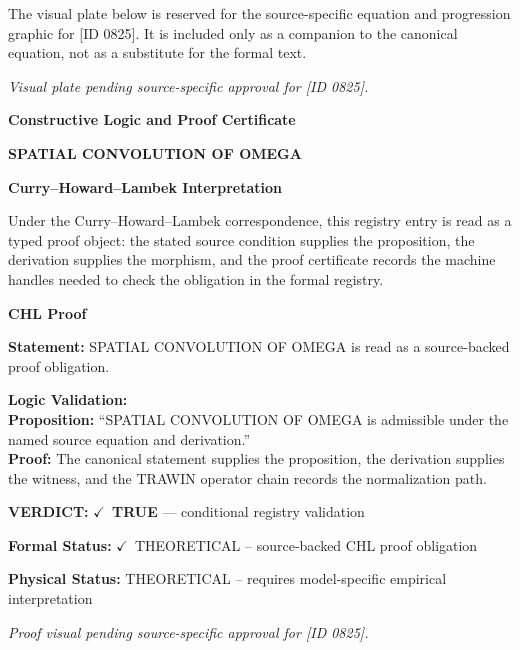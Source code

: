 \begingroup\footnotesize\sloppy
The visual plate below is reserved for the source-specific equation and progression graphic for [ID 0825]. It is included only as a companion to the canonical equation, not as a substitute for the formal text.
\par\endgroup
\begingroup\footnotesize\itshape
Visual plate pending source-specific approval for [ID 0825].
\par\endgroup

\clearpage
\begingroup\tzpsupportsetup
\noindent\textbf{\fontsize{10.8pt}{12.8pt}\selectfont [ID 0825] Constructive Logic and Proof Certificate}\par
\noindent\textbf{\fontsize{10pt}{12pt}\selectfont SPATIAL CONVOLUTION OF OMEGA}\par
\vspace{0.45em}
\begingroup
\footnotesize
\setlength{\parskip}{0.22em}
\setlength{\parindent}{0pt}
\noindent\textbf{Curry--Howard--Lambek Interpretation}\par
Under the Curry--Howard--Lambek correspondence, this registry entry is read as a typed proof
object: the stated source condition supplies the proposition, the derivation supplies the
morphism, and the proof certificate records the machine handles needed to check the obligation
in the formal registry.

\vspace{0.45em}
\noindent\textbf{CHL Proof}\par
\textbf{Statement:} SPATIAL CONVOLUTION OF OMEGA is read as a source-backed proof obligation.

\textbf{Logic Validation:}\\
\textbf{Proposition:} ``SPATIAL CONVOLUTION OF OMEGA is admissible under the named source equation and derivation.''\\
\textbf{Proof:} The canonical statement supplies the proposition, the derivation supplies the witness, and the TRAWIN operator chain records the normalization path.

\textbf{VERDICT:} \ensuremath{\checkmark}\ \textbf{TRUE} --- conditional registry validation

\textbf{Formal Status:} \ensuremath{\checkmark}\ THEORETICAL -- source-backed CHL proof obligation

\textbf{Physical Status:} THEORETICAL -- requires model-specific empirical interpretation
\par\vspace{0.45em}
\par
\vfill
\begingroup\footnotesize\itshape
Proof visual pending source-specific approval for [ID 0825].
\par\endgroup
\vfill
\endgroup
\endgroup

